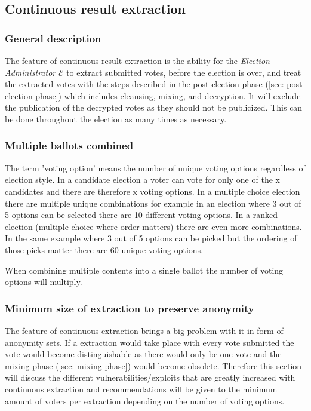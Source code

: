 \subsection{Continuous result extraction} \label{app: continuous result extraction}


\subsubsection{General description}
The feature of continuous result extraction is the ability for the \textit{Election Administrator} $\mathcal{E}$ to extract submitted votes, before the election is over, and treat the extracted votes with the steps described in the post-election phase (\cref{sec: post-election phase}) which includes cleansing, mixing, and decryption. It will exclude the publication of the decrypted votes as they should not be publicized. This can be done throughout the election as many times as necessary. 


\subsubsection{Multiple ballots combined}
The term 'voting option' means the number of unique voting options regardless of election style. In a candidate election a voter can vote for only one of the x candidates and there are therefore x voting options. In a multiple choice election there are multiple unique combinations for example in an election where 3 out of 5 options can be selected there are 10 different voting options. In a ranked election (multiple choice where order matters) there are even more combinations. In the same example where 3 out of 5 options can be picked but the ordering of those picks matter there are 60 unique voting options.

When combining multiple contents into a single ballot the number of voting options will multiply. 


\subsubsection{Minimum size of extraction to preserve anonymity}
The feature of continuous extraction brings a big problem with it in form of anonymity sets. If a extraction would take place with every vote submitted the vote would become distinguishable as there would only be one vote and the mixing phase (\cref{sec: mixing phase}) would become obsolete. Therefore this section will discuss the different vulnerabilities/exploits that are greatly increased with continuous extraction and recommendations will be given to the minimum amount of voters per extraction depending on the number of voting options. 

